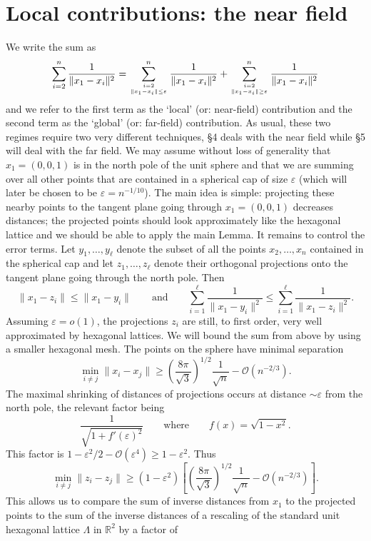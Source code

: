 \documentclass[10pt, reqno]{amsart}
\begin{document}
\section{Local contributions: the near field} 
We write the sum as
$$ \sum_{i=2}^{n} \frac{1}{\|x_1 - x_i\|^2} = \sum_{i=2 \atop \|x_1 - x_i\| \leq \varepsilon}^{n} \frac{1}{\|x_1 - x_i\|^2} +
 \sum_{i=2 \atop \|x_1 - x_i\| \geq \varepsilon}^{n} \frac{1}{\|x_1 - x_i\|^2}$$
 and we refer to the first term as the `local' (or: near-field) contribution and the second term as the `global' (or: far-field) contribution. As usual, these two regimes require two very different techniques, \S 4 deals with the near field while \S 5 will deal with the far field. We may assume without loss of generality that $x_1 = (0,0,1)$ is in the north pole of the unit sphere and that we are summing over all other points that are contained in a spherical cap of size $\varepsilon$ (which will later be chosen to be $\varepsilon = n^{-1/10}$). The main idea is simple: projecting these nearby points to the tangent plane going through $x_1 = (0,0,1)$ decreases distances; the projected points should look approximately like the hexagonal lattice and we should be able to apply the main Lemma.  It remains to control the error terms. Let $y_1, \dots, y_{\ell}$ denote the subset of all the points $x_2, \dots, x_n$ contained in the spherical cap and let $z_1, \dots, z_{\ell}$ denote their orthogonal projections onto the tangent plane going through the north pole. Then
 $$ \|x_1 - z_i\| \leq \|x_1 - y_i\| \qquad \mbox{and} \qquad \sum_{i=1}^{\ell} \frac{1}{\|x_1 - y_i\|^2} \leq  \sum_{i=1}^{\ell} \frac{1}{\|x_1 - z_i\|^2}.$$
Assuming $\varepsilon = o(1)$, the projections $z_i$ are still, to first order, very well approximated by hexagonal lattices. We will bound the sum from above by using a smaller hexagonal mesh. The points on the sphere have minimal separation 
$$ \min_{i \neq j} \|x_i - x_j\| \geq   \left( \frac{8 \pi}{\sqrt{3}} \right)^{1/2} \frac{1}{\sqrt{n}} - \mathcal{O}(n^{-2/3}).$$
The maximal shrinking of distances of projections occurs at distance $\sim \varepsilon$ from the north pole, the relevant factor being
$$ \frac{1}{\sqrt{1 + f'(\varepsilon)^2}} \qquad \mbox{where} \qquad f(x) = \sqrt{1-x^2}.$$
This factor is $1 - \varepsilon^2/2 - \mathcal{O}(\varepsilon^4) \geq 1- \varepsilon^2$. 
Thus
$$ \min_{i \neq j} \|z_i - z_j\| \geq  (1-\varepsilon^2) \left[  \left( \frac{8 \pi}{\sqrt{3}} \right)^{1/2} \frac{1}{\sqrt{n}} - \mathcal{O}(n^{-2/3}) \right].$$
This allows us to compare the sum of inverse distances from $x_1$ to the projected points to the sum of the inverse distances of a rescaling of the standard unit hexagonal lattice $\Lambda$ in $\mathbb{R}^2$ by a factor of
\end{document}
